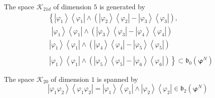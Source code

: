 \documentclass[aps,preprint]{revtex4}%
\begin{document}
The space $\mathcal{K}_{21d}$ of dimension $5$ is generated by%
\begin{align}
&  \left\{  \left\vert \varphi_{1}\right\rangle \left\langle \varphi
_{1}\right\vert \wedge\left(  \left\vert \varphi_{2}\right\rangle \left\langle
\varphi_{2}\right\vert -\left\vert \varphi_{3}\right\rangle \left\langle
\varphi_{3}\right\vert \right)  ,\right. \nonumber\\
&  \,\,\,\left\vert \varphi_{1}\right\rangle \left\langle \varphi
_{1}\right\vert \wedge\left(  \left\vert \varphi_{3}\right\rangle \left\langle
\varphi_{3}\right\vert -\left\vert \varphi_{4}\right\rangle \left\langle
\varphi_{4}\right\vert \right) \nonumber\\
&  \,\left\vert \varphi_{1}\right\rangle \left\langle \varphi_{1}\right\vert
\wedge\left(  \left\vert \varphi_{4}\right\rangle \left\langle \varphi
_{4}\right\vert -\left\vert \varphi_{5}\right\rangle \left\langle \varphi
_{5}\right\vert \right) \nonumber\\
& \nonumber\\
&  \left.  \,\left\vert \varphi_{1}\right\rangle \left\langle \varphi
_{1}\right\vert \wedge\left(  \left\vert \varphi_{5}\right\rangle \left\langle
\varphi_{5}\right\vert -\left\vert \varphi_{6}\right\rangle \left\langle
\varphi_{6}\right\vert \right)  \right\}  \subset\mathfrak{b}_{0}\left(
\mathbf{\varphi}^{N}\right)
\end{align}


The space $\mathcal{K}_{20}$ of dimension $1$ is spanned by
\begin{equation}
\left\vert \varphi_{1}\varphi_{2}\right\rangle \left\langle \varphi_{1}%
\varphi_{2}\right\vert =\left\vert \varphi_{1}\right\rangle \left\langle
\varphi_{1}\right\vert \wedge\left\vert \varphi_{2}\right\rangle \left\langle
\varphi_{2}\right\vert \in\mathfrak{b}_{2}\left(  \mathbf{\varphi}^{N}\right)
\end{equation}
\end{document}
